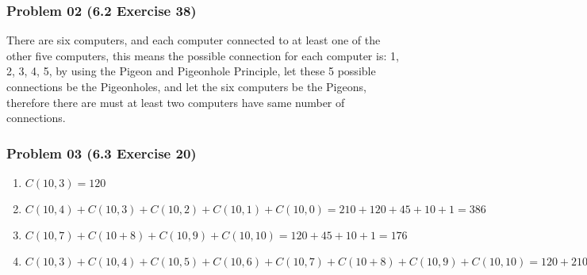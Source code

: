 \documentclass[14pt,hyperref={bookmarks=false}]{beamer}
\begin{document}
	\begin{frame}
	\frametitle{Problem 02 (6.2 Exercise 38)}
	\fontsize{12}{16pt}\selectfont
	There are six computers, and each computer connected to at least one of the other five computers, this means the possible connection for each computer is: 1, 2, 3, 4, 5, by using the Pigeon and Pigeonhole Principle, let these 5 possible connections be the Pigeonholes, and let the six computers be the Pigeons, therefore there are must at least two computers have same number of connections.\\
	
	\end{frame}
	
	\begin{frame}
	\frametitle{Problem 03 (6.3 Exercise 20)}
	\fontsize{10}{10pt}\selectfont
	\begin{enumerate}[label=(\alph*)]
	\item $C(10,3)=120$
	\item $C(10,4)+C(10,3)+C(10,2)+C(10,1)+C(10,0)=210+120+45+10+1=386$
	\item $C(10,7)+C(10+8)+C(10,9)+C(10,10)=120+45+10+1=176$
	\item $ C(10,3)+C(10,4)+C(10,5)+C(10,6)+C(10,7)+C(10+8)+C(10,9)+C(10,10)=120+210+252+210+120+45+10+1=968$
	\end{enumerate}
	\end{frame}
\end{document}
